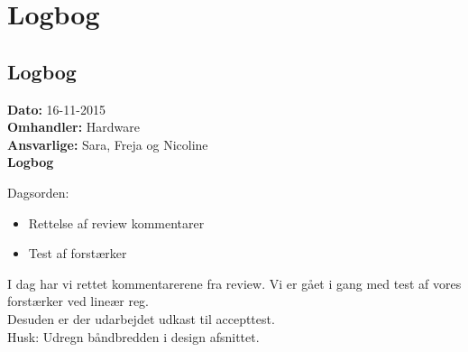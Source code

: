 \chapter{Logbog}
\section{Logbog}

\textbf{Dato:} 16-11-2015 \\
\textbf{Omhandler:} Hardware \\
\textbf{Ansvarlige:} Sara, Freja og Nicoline \\
\textbf{Logbog}

Dagsorden:
\begin{itemize}
	\item Rettelse af review kommentarer
	\item Test af forstærker
\end{itemize}
I dag har vi rettet kommentarerene fra review. Vi er gået i gang med test af vores forstærker ved lineær reg.\\
Desuden er der udarbejdet udkast til accepttest.\\
Husk: Udregn båndbredden i design afsnittet.\\

   
